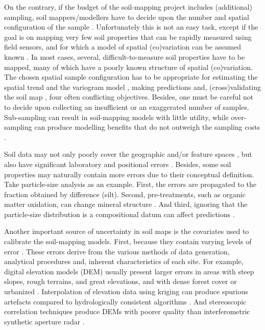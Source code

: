 On the contrary, if the budget of the soil-mapping project includes (additional) sampling, soil 
mappers/modellers have to decide upon the number and spatial configuration of the sample 
\citep{deGruijterEtAl2006, WebsterEtAl2013}. Unfortunately this is not an easy task, except if the 
goal is on mapping very few soil properties that can be rapidly measured using field sensors, and for 
which a model of spatial (co)variation can be assumed known \citep{MarchantEtAl2006}. In most cases,
several, difficult-to-measure soil properties have to be mapped, many of which have a poorly known 
structure of spatial (co)variation. The chosen spatial sample configuration has to be appropriate 
for estimating the spatial trend \citep{HenglEtAl2003a, MinasnyEtAl2006b} and the variogram model 
\citep{WarrickEtAl1987, WebsterEtAl1992, Lark2002}, making predictions 
\citep{YfantisEtAl1987, WalvoortEtAl2010} and, (cross)validating the soil map \citep{BrusEtAl2011}, 
four often conflicting objectives. Besides, one must be careful not to decide upon collecting an 
insufficient or an exaggerated number of samples. Sub-sampling can result in soil-mapping models 
with little utility, while over-sampling can produce modelling benefits that do not outweigh the
sampling costs \citep{vanGroenigenEtAl1999}.

Soil data may not only poorly cover the geographic and/or feature spaces \citep{HenglEtAl2003a}, but
also have significant laboratory and positional errors \citep{NelsonEtAl2011}. Besides, some soil 
properties may naturally contain more errors due to their conceptual definition. Take particle-size
analysis as an example. First, the errors are propagated to the fraction obtained by difference 
(silt). Second, pre-treatments, such as organic matter oxidation, can change mineral structure
\citep{MikuttaEtAl2005a}. And third, ignoring that the particle-size distribution is a compositional
datum can affect predictions \citep{LarkEtAl2007}.

Another important source of uncertainty in soil maps is the covariates used to calibrate the 
soil-mapping models. First, because they contain varying levels of error \citep{HeuvelinkEtAl1989}.
These errors derive from the various methods of data generation, analytical procedures and, 
inherent characteristics of each site. For example, digital elevation models (DEM) usually present 
larger errors in areas with steep slopes, rough terrains, and great elevations, and with dense 
forest cover or urbanized \citep{Florinsky1998, Toutin2000, FisherEtAl2006}. Interpolation of 
elevation data using kriging can produce spurious artefacts \citep{HenglEtAl2009} compared to 
hydrologically consistent algorithms \citep{Hutchinson1989}. And stereoscopic correlation techniques
produce DEMs with poorer quality than interferometric synthetic aperture radar \citep{HirtEtAl2010}.

